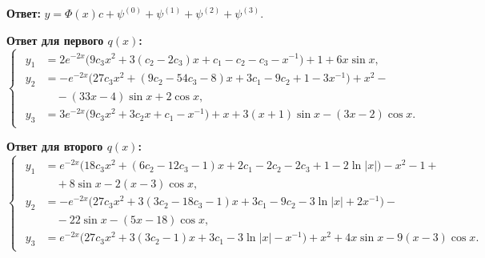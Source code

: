\documentclass[11pt]{article}
\begin{document}
{\bigskip
\textbf{Ответ:}
$y=\Phi(x)c + \psi^{(0)} + \psi^{(1)} + \psi^{(2)} + \psi^{(3)}.$

\bigskip
\textbf{Ответ для первого $q(x)$:}
\begin{equation*}
\begin{cases}
\begin{aligned}
y_1 &= 2e^{-2x} \big( 9c_3 x^2 + 3(c_2 - 2c_3)x + c_1 - c_2 - c_3 - x^{-1} \big) + 1 + 6x\sin x, \\
y_2 &= -e^{-2x} \big( 27c_3 x^2 + (9c_2 - 54c_3 - 8)x + 3c_1 - 9c_2 + 1 - 3x^{-1} \big) + x^2 - \\
& \quad - (33x-4)\sin x + 2\cos x, \\
y_3 &= 3e^{-2x} \big( 9c_3 x^2 + 3c_2x + c_1 - x^{-1} \big) + x + 3(x+1)\sin x - (3x-2) \cos x .
\end{aligned}
\end{cases}
\end{equation*}

\textbf{Ответ для второго $q(x)$:}
\begin{equation*}
\begin{cases}
\begin{aligned}
y_1 &= e^{-2x} \big( 18c_3 x^2 + (6c_2 - 12c_3 - 1)x + 2c_1 - 2c_2 - 2c_3 + 1 - 2 \ln|x| \big) - x^2 - 1 + \\
& \quad + 8\sin x - 2(x-3) \cos x, \\
y_2 &= -e^{-2x} \big( 27c_3x^2 + 3(3c_2 - 18c_3 - 1)x + 3c_1 - 9c_2 - 3\ln|x| + 2x^{-1} \big) - \\
& \quad - 22\sin x - (5x - 18)\cos x, \\
y_3 &= e^{-2x} \big( 27c_3 x^2 + 3(3c_2-1) x + 3c_1 - 3\ln|x| - x^{-1} \big) + x^2 +4x\sin x - 9(x-3)\cos x.
\end{aligned}
\end{cases}
\end{equation*}

}
\end{document}
